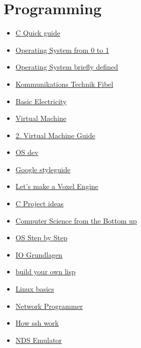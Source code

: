 \documentclass[a4paper, 12pt]{scrartcl}
\begin{document}
    \section {Programming}
    \begin{itemize}
        \item \href{https://www.tutorialspoint.com/cprogramming/c_quick_guide.htm}{C Quick guide}
        \item \href{file:///D:/Documents/ProgrammierenResources/Operating_Systems_From_0_to_1.pdf}{Operating System from 0 to 1}
        \item \href{https://ops-class.org/slides/2017-01-30-intro/}{Operating System briefly defined}
        \item \href{file:///D:/Documents/ProgrammierenResources/Grundlagen%20Netze%20Mobilfunk%20Breitband%20NGN.pdf}{Kommunikations Technik Fibel}
        \item \href{https://www.allaboutcircuits.com/textbook/}{Basic Electricity}
        \item \href{https://felixangell.com/blogs/virtual-machine-in-c}{Virtual Machine}
        \item \href{https://justinmeiners.github.io/lc3-vm/}{2. Virtual Machine Guide}
        \item \href{https://wiki.osdev.org/Main_Page}{OS dev}
        \item \href{https://google.github.io/styleguide/}{Google styleguide}
        \item \href{https://sites.google.com/site/letsmakeavoxelengine/home}{Let's make a Voxel Engine}
        \item \href{https://github.com/rby90/Project-Based-Tutorials-in-C}{C Project ideas}
        \item \href{http://www.bottomupcs.com/}{Computer Science from the Bottom up}
        \item \href{http://pages.cs.wisc.edu/~remzi/OSTEP/}{OS Step by Step}
        \item \href{https://www.bjoern-koester.de/iogrundlagen/}{IO Grundlagen}
        \item \href{http://www.buildyourownlisp.com/}{build your own lisp}
        \item \href{https://www.youtube.com/watch?v=IVquJh3DXUA}{Linux basics}
        \item \href{https://beej.us/guide/bgnet/html//index.html}{Network Programmer}
        \item \href{https://www.hostinger.com/tutorials/ssh-tutorial-how-does-ssh-work}{How ssh work}
        \item \href{https://shonumi.github.io/articles/art3.html}{NDS Emulator}
    \end{itemize}
\end{document}
